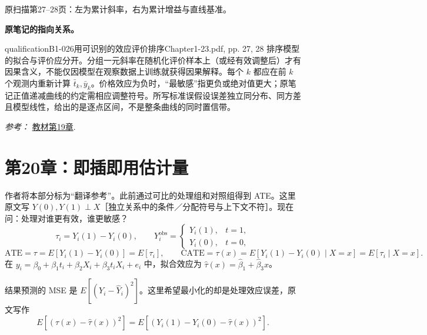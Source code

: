 {\begin{center}
\begin{tikzpicture}[>=Stealth, font=\small, line width=.65pt]
\end{tikzpicture}
\par{\small 原扫描第27--28页：左为累计斜率，右为累计增益与直线基准。}
\end{center}
\par{}\smallskip\textbf{原笔记的指向关系。}\par\smallskip
{}
\begin{reviewnote}{qualification}{B1-026}{用可识别的效应评价排序}{Chapter1-23.pdf, pp. 27, 28}
排序模型的拟合与评价应分开。分组一元斜率在随机化评价样本上（或经有效调整后）才有因果含义，不能仅因模型在观察数据上训练就获得因果解释。每个 $k$ 都应在前 $k$ 个观测内重新计算 $\bar t_k,\bar y_k$。价格效应为负时，“最敏感”指更负或绝对值更大；原笔记正值递减曲线的约定需相应调整符号。所写标准误假设误差独立同分布、同方差且模型线性，给出的是逐点区间，不是整条曲线的同时置信带。
\par\smallskip\textit{参考：} \href{https://matheusfacure.github.io/python-causality-handbook/19-Evaluating-Causal-Models.html}{教材第19章}.
\end{reviewnote}
\section{第20章：即插即用估计量}
作者将本部分标为“翻译参考”。此前通过可比的处理组和对照组得到 ATE。这里原文写 $Y(0),Y(1)\perp X$［独立关系中的条件／分配符号与上下文不符］。现在问：处理对谁更有效，谁更敏感？
\[\tau_i=Y_i(1)-Y_i(0),\qquad
Y_i^{\mathrm{obs}}=\begin{cases}Y_i(1),&t=1,\\Y_i(0),&t=0,\end{cases}
\]
\[\mathrm{ATE}=\tau=E[Y_i(1)-Y_i(0)]=E[\tau_i],\qquad
\mathrm{CATE}=\tau(x)=E[Y_i(1)-Y_i(0)\mid X=x]=E[\tau_i\mid X=x].\]
在 $y_i=\beta_0+\beta_1t_i+\beta_2X_i+\beta_3t_iX_i+e_i$ 中，拟合效应为 $\hat\tau(x)=\hat\beta_1+\hat\beta_3x$。

结果预测的 MSE 是 $E[(Y_i-\hat Y_i)^2]$。这里希望最小化的却是处理效应误差，原文写作
\[E[(\tau(x)-\hat\tau(x))^2]=E[(Y_i(1)-Y_i(0)-\hat\tau(x))^2].\]


}
